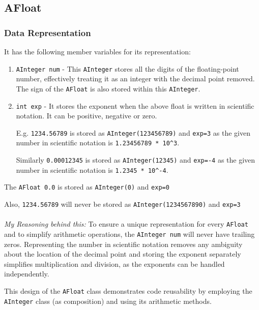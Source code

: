 \documentclass[a4paper,12pt]{article}
\begin{document}
\subsection{AFloat}

\subsubsection{Data Representation}

It has the following member variables for its representation:

\begin{enumerate}
    \item \texttt{AInteger num} - This \texttt{AInteger} stores all the digits of the floating-point number, effectively treating it as an integer with the decimal point removed. The sign of the \texttt{AFloat} is also stored within this \texttt{AInteger}.
    \item \texttt{int exp} - It stores the exponent when the above float is written in scientific notation. It can be positive, negative or zero.

    E.g. \texttt{1234.56789} is stored as \texttt{AInteger(123456789)} and \texttt{exp=3} as the given number in scientific notation is \texttt{1.23456789 * 10\^{}3}.

    Similarly \texttt{0.00012345} is stored as \texttt{AInteger(12345)} and \texttt{exp=-4} as the given number in scientific notation is \texttt{1.2345 * 10\^{}-4}.
\end{enumerate}

The \texttt{AFloat 0.0} is stored as \texttt{AInteger(0)} and \texttt{exp=0}

Also, \texttt{1234.56789} will never be stored as \texttt{AInteger(1234567890)} and \texttt{exp=3}\\\\

\textit{My Reasoning behind this:} To ensure a unique representation for every \texttt{AFloat} and to simplify arithmetic operations, the \texttt{AInteger num} will never have trailing zeros. Representing the number in scientific notation removes any ambiguity about the location of the decimal point and storing the exponent separately simplifies multiplication and division, as the exponents can be handled independently.

This design of the \texttt{AFloat} class demonstrates code reusability by employing the \texttt{AInteger} class (as composition) and using its arithmetic methods.\\
\end{document}
